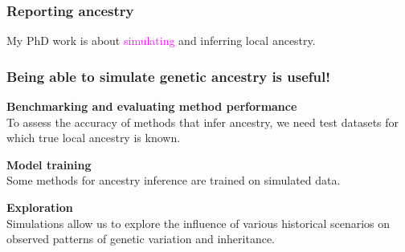 \documentclass[11pt, mathserif, aspectratio=169]{beamer}
\newcommand{\magenta}[1]{\textcolor{magenta}{#1}}
\newenvironment{wideitemize}{\itemize\addtolength{\itemsep}{10pt}}{\enditemize}
\begin{document}
%
%

\begin{frame}
\begin{center}

\end{center}
\end{frame}


\begin{frame}
\frametitle{Reporting ancestry}
\begin{center}

\end{center}
My PhD work is about \magenta{simulating} and inferring local ancestry.\\[2mm]

\end{frame}

\begin{frame}
\frametitle{Being able to simulate genetic ancestry is useful!}
\begin{wideitemize}
\item {\bf Benchmarking and evaluating method performance\\}
To assess the accuracy of methods that infer ancestry, we need test datasets for which true local ancestry is known.
\item {\bf Model training\\}
Some methods for ancestry inference are trained on simulated data.
\item {\bf Exploration\\}
Simulations allow us to explore the influence of various historical scenarios on observed patterns of genetic variation and inheritance.
\end{wideitemize}
\end{frame}
\end{document}
